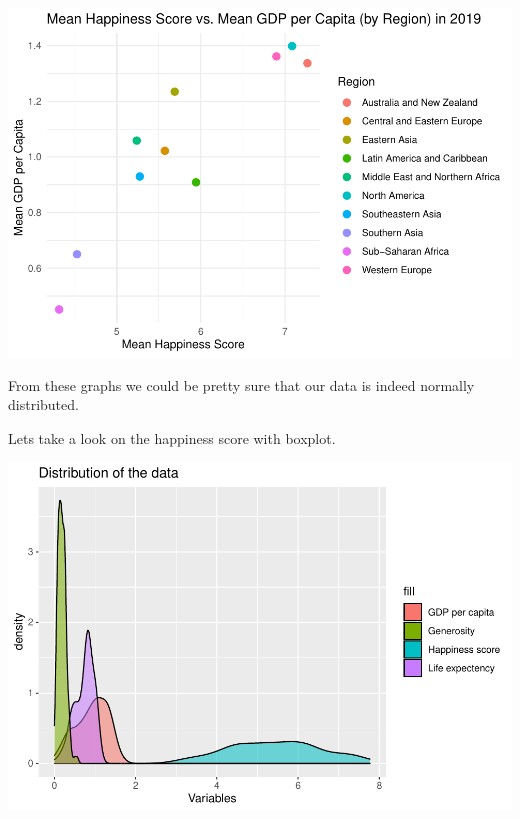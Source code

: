 \documentclass[
]{article}
\newenvironment{Shaded}{\begin{snugshade}}{\end{snugshade}}
\newcommand{\AttributeTok}[1]{\textcolor[rgb]{0.77,0.63,0.00}{#1}}
\newcommand{\FunctionTok}[1]{\textcolor[rgb]{0.00,0.00,0.00}{#1}}
\newcommand{\NormalTok}[1]{#1}
\newcommand{\SpecialCharTok}[1]{\textcolor[rgb]{0.00,0.00,0.00}{#1}}
\newcommand{\StringTok}[1]{\textcolor[rgb]{0.31,0.60,0.02}{#1}}
\begin{document}
\includegraphics{World-Happiness_files/figure-latex/unnamed-chunk-5-1.pdf}

From these graphs we could be pretty sure that our data is indeed
normally distributed.

Lets take a look on the happiness score with boxplot.

\begin{Shaded}
\end{Shaded}

\includegraphics{World-Happiness_files/figure-latex/unnamed-chunk-6-1.pdf}\\
\end{document}
